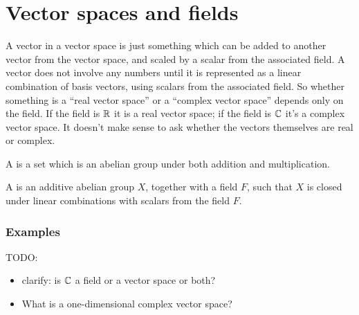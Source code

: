 \section{Vector spaces and fields}\label{real-and-complex-vector-spaces}
A vector in a vector space is just something which can be added to another vector from the vector
space, and scaled by a scalar from the associated field. A vector does not involve any numbers until
it is represented as a linear combination of basis vectors, using scalars from the associated
field. So whether something is a ``real vector space'' or a ``complex vector space'' depends only on
the field. If the field is $\mathbb{R}$ it is a real vector space; if the field is $\mathbb{C}$ it's a complex
vector space. It doesn't make sense to ask whether the vectors themselves are real or complex.

A  is a set which is an abelian group under both addition and multiplication.

A  is an additive abelian group $X$, together with a field $F$, such that $X$ is
closed under linear combinations with scalars from the field $F$.

\subsubsection{Examples}

TODO:
\begin{itemize}
\item clarify: is $\mathbb{C}$ a field or a vector space or both?
\item What is a one-dimensional complex vector space?
\end{itemize}

